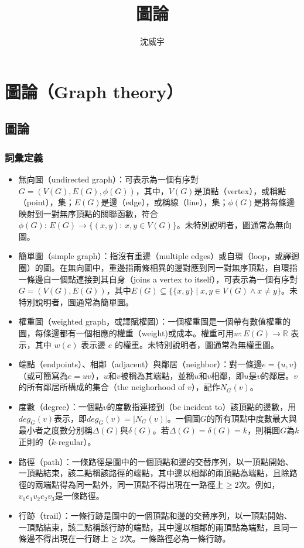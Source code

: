 \documentclass[a4paper,12pt]{report}
\begin{document}
\title{圖論}
\author{沈威宇}
\date{\temtoday}
\titletocdoc
\chapter{圖論（Graph theory）}
\section{圖論}
\subsection{詞彙定義}
\begin{itemize}
\item 無向圖（undirected graph）：可表示為一個有序對$G=(V(G), E(G), \phi(G))$，其中，$V(G)$是頂點（vertex），或稱點（point），集；$E(G)$是邊（edge），或稱線（line），集；$\phi(G)$是將每條邊映射到一對無序頂點的關聯函數，符合$\phi(G): \,E(G)\to\{(x, y):\, x, y\in V(G)\}$。未特別說明者，圖通常為無向圖。
\item 簡單圖（simple graph）：指沒有重邊（multiple edges）或自環（loop，或譯迴圈）的圖。在無向圖中，重邊指兩條相異的邊對應到同一對無序頂點，自環指一條邊自一個點連接到其自身（joins a vertex to itself），可表示為一個有序對$G=(V(G), E(G))$，其中$E(G)\subseteq\{\{x, y\}\mid x, y\in V(G)\wedge x\neq y\}$。未特別說明者，圖通常為簡單圖。
\item 權重圖（weighted graph，或譯賦權圖）：一個權重圖是一個帶有數值權重的圖，每條邊都有一個相應的權重（weight)或成本。權重可用$w: E(G) \rightarrow \mathbb{R}$ 表示，其中 $w(e)$ 表示邊 $e$ 的權重。未特別說明者，圖通常為無權重圖。 
\item 端點（endpoints）、相鄰（adjacent）與鄰居（neighbor）：對一條邊$e=\{u, v\}$（或可簡寫為$e=uv$），$u$和$v$被稱為其端點，並稱$u$和$v$相鄰，即$u$是$v$的鄰居。$v$的所有鄰居所構成的集合（the neighorhood of $v$），記作$N_G(v)$。
\item 度數（degree）：一個點$v$的度數指連接到（be incident to）該頂點的邊數，用$deg_G(v)$表示，即$deg_G(v)=|N_G(v)|$。一個圖$G$的所有頂點中度數最大與最小者之度數分別稱$\Delta(G)$與$\delta(G)$。若$\Delta(G)=\delta(G)=k$，則稱圖$G$為$k$正則的（$k$-regular）。
\item 路徑（path）：一條路徑是圖中的一個頂點和邊的交替序列，以一頂點開始、一頂點結束，該二點稱該路徑的端點，其中邊以相鄰的兩頂點為端點，且除路徑的兩端點得為同一點外，同一頂點不得出現在一路徑上$\geq 2$次。例如，$v_1e_1v_2e_2v_3$是一條路徑。
\item 行跡（trail）：一條行跡是圖中的一個頂點和邊的交替序列，以一頂點開始、一頂點結束，該二點稱該行跡的端點，其中邊以相鄰的兩頂點為端點，且同一條邊不得出現在一行跡上$\geq 2$次。一條路徑必為一條行跡。

\end{itemize}
\end{document}
